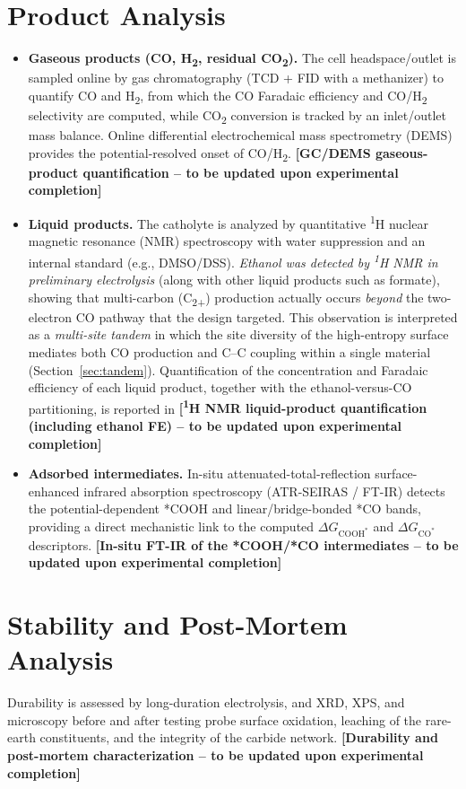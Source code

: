 \documentclass[11pt,a4paper]{report}
\newcommand{\tbu}[1]{\textcolor{red!70!black}{\textbf{[#1 -- to be updated upon experimental completion]}}}
\newcommand{\dGCO}{\Delta G_{\mathrm{CO^*}}}
\newcommand{\dGCOOH}{\Delta G_{\mathrm{COOH^*}}}
\begin{document}
\section{Product Analysis}
\begin{itemize}[nosep]
\item \textbf{Gaseous products (CO, H\textsubscript{2}, residual CO\textsubscript{2}).} The cell
headspace/outlet is sampled online by gas chromatography (TCD + FID with a methanizer) to quantify CO and
H\textsubscript{2}, from which the CO Faradaic efficiency and CO/H\textsubscript{2} selectivity are computed,
while CO\textsubscript{2} conversion is tracked by an inlet/outlet mass balance. Online differential
electrochemical mass spectrometry (DEMS) provides the potential-resolved onset of CO/H\textsubscript{2}.
\tbu{GC/DEMS gaseous-product quantification}
\item \textbf{Liquid products.} The catholyte is analyzed by quantitative \textsuperscript{1}H nuclear
magnetic resonance (NMR) spectroscopy with water suppression and an internal standard (e.g., DMSO/DSS).
\emph{Ethanol was detected by \textsuperscript{1}H NMR in preliminary electrolysis} (along with other liquid
products such as formate), showing that multi-carbon (C\textsubscript{2+}) production actually occurs
\emph{beyond} the two-electron CO pathway that the design targeted. This observation is interpreted as a
\emph{multi-site tandem} in which the site diversity of the high-entropy surface mediates both CO production
and C--C coupling within a single material (Section~\ref{sec:tandem}). Quantification of the concentration and
Faradaic efficiency of each liquid product, together with the ethanol-versus-CO partitioning, is reported in
\tbu{\textsuperscript{1}H NMR liquid-product quantification (including ethanol FE)}
\item \textbf{Adsorbed intermediates.} In-situ attenuated-total-reflection surface-enhanced infrared
absorption spectroscopy (ATR-SEIRAS / FT-IR) detects the potential-dependent *COOH and linear/bridge-bonded
*CO bands, providing a direct mechanistic link to the computed $\dGCOOH$ and $\dGCO$ descriptors.
\tbu{In-situ FT-IR of the *COOH/*CO intermediates}
\end{itemize}

\section{Stability and Post-Mortem Analysis}
Durability is assessed by long-duration electrolysis, and XRD, XPS, and microscopy before and after testing
probe surface oxidation, leaching of the rare-earth constituents, and the integrity of the carbide network.
\tbu{Durability and post-mortem characterization}
\end{document}
